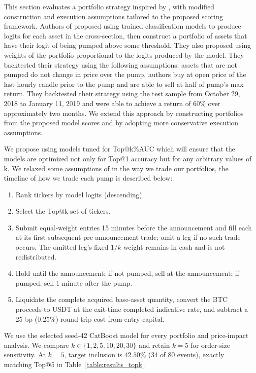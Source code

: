 \documentclass{ieeeaccess}
\begin{document}
This section evaluates a portfolio strategy inspired by \cite{pd_anatomy}, with modified construction and execution assumptions tailored to the proposed scoring framework. Authors of \cite{pd_anatomy} proposed using trained classification models to produce logits for each asset in the cross-section, then construct a portfolio of assets that have their logit of being pumped above some threshold. They also proposed using weights of the portfolio proportional to the logits produced by the model. They backtested their strategy using the following assumptions: assets that are not pumped do not change in price over the pump, authors buy at open price of the last hourly candle prior to the pump and are able to sell at half of pump's max return. They backtested their strategy using the test sample from October 29, 2018 to January 11, 2019 and were able to achieve a return of 60\% over approximately two months. We extend this approach by constructing portfolios from the proposed model scores and by adopting more conservative execution assumptions. 

We propose using models tuned for Top@k\%AUC which will ensure that the models are optimized not only for Top@1 accuracy but for any arbitrary values of k. We relaxed some assumptions of \cite{pd_anatomy} in the way we trade our portfolios, the timeline of how we trade each pump is described below:

\begin{enumerate}
  \item Rank tickers by model logits (descending).
  \item Select the Top@k set of tickers.
  \item Submit equal-weight entries 15 minutes before the announcement and fill each at its first subsequent pre-announcement trade; omit a leg if no such trade occurs. The omitted leg's fixed $1/k$ weight remains in cash and is not redistributed.
  \item Hold until the announcement; if not pumped, sell at the announcement; if pumped, sell 1 minute after the pump.
  \item Liquidate the complete acquired base-asset quantity, convert the BTC proceeds to USDT at the exit-time completed indicative rate, and subtract a $25$ bp ($0.25\%$) round-trip cost from entry capital.
\end{enumerate}


We use the selected seed-42 CatBoost model for every portfolio and price-impact analysis. We compare $k\in\{1,2,5,10,20,30\}$ and retain $k=5$ for order-size sensitivity. At $k=5$, target inclusion is $42.50\%$ (34 of 80 events), exactly matching Top@5 in Table~\ref{table:results_topk}.
\end{document}
